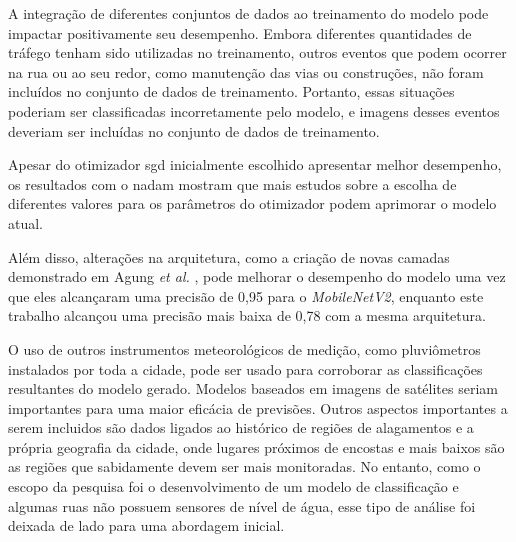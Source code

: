 A integração de diferentes conjuntos de dados ao treinamento do modelo pode impactar positivamente seu desempenho.
Embora diferentes quantidades de tráfego tenham sido utilizadas no treinamento, outros eventos que podem ocorrer na rua ou ao seu redor, como manutenção das vias ou construções, 
não foram incluídos no conjunto de dados de treinamento. 
Portanto, essas situações poderiam ser classificadas incorretamente pelo modelo, e imagens desses eventos deveriam ser incluídas no conjunto de dados de treinamento.

Apesar do otimizador \acrshort{sgd} inicialmente escolhido apresentar melhor desempenho, 
os resultados com o \acrshort{nadam} mostram que mais estudos sobre a escolha de diferentes valores para os parâmetros do otimizador podem aprimorar o modelo atual.

Além disso, alterações na arquitetura, como a criação de novas camadas demonstrado em Agung \textit{et al.} \cite{agung2023}, 
pode melhorar o desempenho do modelo uma vez que eles alcançaram uma precisão de 0,95 para o \textit{MobileNetV2}, 
enquanto este trabalho alcançou uma precisão mais baixa de 0,78 com a mesma arquitetura.

O uso de outros instrumentos meteorológicos de medição, como pluviômetros instalados por toda a cidade, pode ser usado para corroborar as classificações resultantes do modelo gerado. 
Modelos baseados em imagens de satélites seriam importantes para uma maior eficácia de previsões.
Outros aspectos importantes a serem incluidos são dados ligados ao histórico de regiões de alagamentos e a própria geografia da cidade, onde lugares próximos de encostas e mais baixos são as regiões que sabidamente devem ser mais monitoradas. 
No entanto, como o escopo da pesquisa foi o desenvolvimento de um modelo de classificação e algumas ruas não possuem sensores de nível de água, 
esse tipo de análise foi deixada de lado para uma abordagem inicial.
